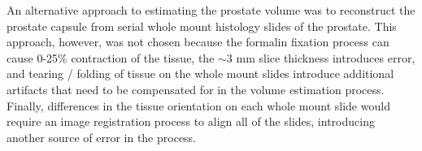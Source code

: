 An alternative approach to estimating the prostate volume was to reconstruct
the prostate capsule from serial whole mount histology slides of the prostate.
This approach, however, was not chosen because the formalin fixation process
can cause 0-25\% contraction of the tissue, the $\sim$3 mm slice thickness
introduces error, and tearing / folding of tissue on the whole mount slides
introduce additional artifacts that need to be compensated for in the volume
estimation process.  Finally, differences in the tissue orientation on each
whole mount slide would require an image registration process to align all of
the slides, introducing another source of error in the process.
